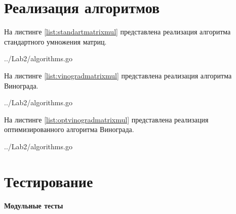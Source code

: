 \section{Реализация алгоритмов}\label{Listings}

На листинге \ref{list:standartmatrixmul} представлена реализация алгоритма стандартного умножения матриц.

\begin{lstinputlisting}
    [caption = {Реализация стандартного алгоритма умножения матриц},
    label = {list:standartmatrixmul},
    linerange={10-25},
    ]{../Lab2/algorithms.go}
\end{lstinputlisting}

На листинге \ref{list:vinogradmatrixmul} представлена реализация алгоритма Винограда.

\begin{lstinputlisting}
    [caption = {Реализация алгоритма Винограда},
    label = {list:vinogradmatrixmul},
    linerange={28-68},
    ]{../Lab2/algorithms.go}
\end{lstinputlisting}


На листинге \ref{list:optvinogradmatrixmul} представлена реализация оптимизированного алгоритма Винограда.

\begin{lstinputlisting}
    [caption = {Реализация оптимизированного алгоритма Винограда},
    label = {list:optvinogradmatrixmul},
    linerange={71-110},
    ]{../Lab2/algorithms.go}
\end{lstinputlisting}

\section{Тестирование}\label{TestResult}


\textbf{Модульные тесты}


